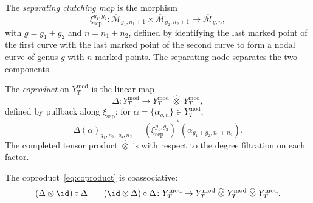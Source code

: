 \begin{definition}
The \emph{separating clutching map} is the morphism
\begin{equation}
\xi_{\mathrm{sep}}^{g_1, g_2} \colon
\overline{\mathcal{M}}_{g_1, n_1+1}
\times
\overline{\mathcal{M}}_{g_2, n_2+1}
\longrightarrow
\overline{\mathcal{M}}_{g, n},
\end{equation}
with $g = g_1 + g_2$ and $n = n_1 + n_2$, defined by identifying
the last marked point of the first curve with the last marked point
of the second curve to form a nodal curve of genus $g$ with $n$
marked points. The separating node separates the two components.

The \emph{coproduct} on $Y_T^{\mathrm{mod}}$ is the linear map
\begin{equation}
\Delta \colon Y_T^{\mathrm{mod}}
\longrightarrow
Y_T^{\mathrm{mod}} \;\widehat{\otimes}\; Y_T^{\mathrm{mod}},
\end{equation}
defined by pullback along $\xi_{\mathrm{sep}}$: for
$\alpha = \{\alpha_{g,n}\} \in Y_T^{\mathrm{mod}}$,
\[
\Delta(\alpha)_{g_1, n_1;\, g_2, n_2}
= (\xi_{\mathrm{sep}}^{g_1, g_2})^\ast(\alpha_{g_1+g_2, n_1+n_2}).
\]
The completed tensor product $\widehat{\otimes}$ is with respect
to the degree filtration on each factor.
\end{definition}

\begin{theorem}
The coproduct~\eqref{eq:coproduct} is coassociative:
\begin{equation}
(\Delta \otimes \id) \circ \Delta
\;=\;
(\id \otimes \Delta) \circ \Delta
\colon
Y_T^{\mathrm{mod}}
\to
Y_T^{\mathrm{mod}}
\;\widehat{\otimes}\;
Y_T^{\mathrm{mod}}
\;\widehat{\otimes}\;
Y_T^{\mathrm{mod}}.
\end{equation}
\end{theorem}

